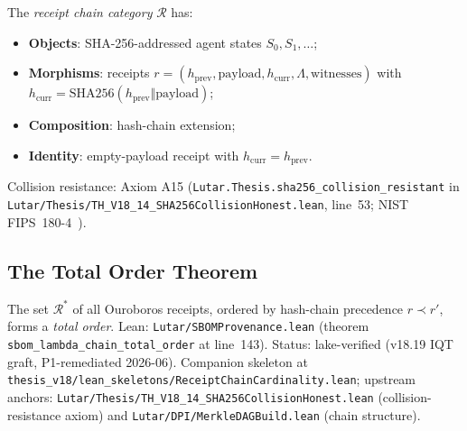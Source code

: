 \begin{definition}
\label{def:receipt-category}
The \emph{receipt chain category} $\mathcal{R}$ has:
\begin{itemize}
  \item \textbf{Objects}: SHA-256-addressed agent states
        $S_0, S_1, \ldots$;
  \item \textbf{Morphisms}: receipts $r = (h_{\mathrm{prev}},
        \mathrm{payload}, h_{\mathrm{curr}}, \Lambda, \mathrm{witnesses})$
        with $h_{\mathrm{curr}} = \mathrm{SHA256}(h_{\mathrm{prev}} \Vert \mathrm{payload})$;
  \item \textbf{Composition}: hash-chain extension;
  \item \textbf{Identity}: empty-payload receipt with $h_{\mathrm{curr}} = h_{\mathrm{prev}}$.
\end{itemize}
\textup{Collision resistance:} Axiom A15 (\texttt{Lutar.Thesis.sha256\_collision\_resistant}
in \texttt{Lutar/Thesis/TH\_V18\_14\_SHA256CollisionHonest.lean}, line~53;
NIST FIPS~180-4~\cite{NIST-FIPS-180-4}).
\end{definition}

\subsection{The Total Order Theorem}
\label{subsec:total-order}

\begin{theorem}
\label{thm:total-order}
The set $\mathcal{R}^*$ of all Ouroboros receipts, ordered by hash-chain
precedence $r \prec r'$, forms a \emph{total order}.
\textup{Lean:} \texttt{Lutar/SBOMProvenance.lean} (theorem
\texttt{sbom\_lambda\_chain\_total\_order} at line~143).
\textup{Status:} lake-verified (v18.19 IQT graft, P1-remediated 2026-06).
Companion skeleton at
\texttt{thesis\_v18/lean\_skeletons/ReceiptChainCardinality.lean};
upstream anchors:
\texttt{Lutar/Thesis/TH\_V18\_14\_SHA256CollisionHonest.lean} (collision-resistance axiom)
and \texttt{Lutar/DPI/MerkleDAGBuild.lean} (chain structure).


\end{theorem}

